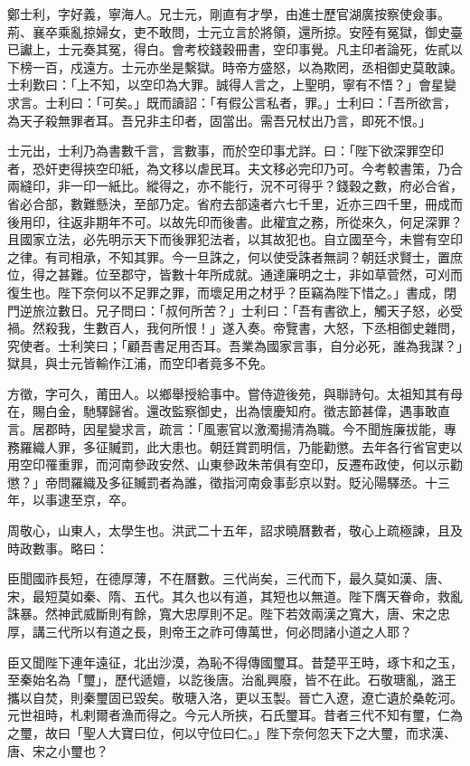 \begin{pinyinscope}
鄭士利，字好義，寧海人。兄士元，剛直有才學，由進士歷官湖廣按察使僉事。荊、襄卒乘亂掠婦女，吏不敢問，士元立言於將領，還所掠。安陸有冤獄，御史臺已讞上，士元奏其冤，得白。會考校錢穀冊書，空印事覺。凡主印者論死，佐貳以下榜一百，戍遠方。士元亦坐是繫獄。時帝方盛怒，以為欺罔，丞相御史莫敢諫。士利歎曰：「上不知，以空印為大罪。誠得人言之，上聖明，寧有不悟？」會星變求言。士利曰：「可矣。」既而讀詔：「有假公言私者，罪。」士利曰：「吾所欲言，為天子殺無罪者耳。吾兄非主印者，固當出。需吾兄杖出乃言，即死不恨。」

士元出，士利乃為書數千言，言數事，而於空印事尤詳。曰：「陛下欲深罪空印者，恐奸吏得挾空印紙，為文移以虐民耳。夫文移必完印乃可。今考較書策，乃合兩縫印，非一印一紙比。縱得之，亦不能行，況不可得乎？錢穀之數，府必合省，省必合部，數難懸決，至部乃定。省府去部遠者六七千里，近亦三四千里，冊成而後用印，往返非期年不可。以故先印而後書。此權宜之務，所從來久，何足深罪？且國家立法，必先明示天下而後罪犯法者，以其故犯也。自立國至今，未嘗有空印之律。有司相承，不知其罪。今一旦誅之，何以使受誅者無詞？朝廷求賢士，置庶位，得之甚難。位至郡守，皆數十年所成就。通達廉明之士，非如草菅然，可刈而復生也。陛下奈何以不足罪之罪，而壞足用之材乎？臣竊為陛下惜之。」書成，閉門逆旅泣數日。兄子問曰：「叔何所苦？」士利曰：「吾有書欲上，觸天子怒，必受禍。然殺我，生數百人，我何所恨！」遂入奏。帝覽書，大怒，下丞相御史雜問，究使者。士利笑曰；「顧吾書足用否耳。吾業為國家言事，自分必死，誰為我謀？」獄具，與士元皆輸作江浦，而空印者竟多不免。

方徵，字可久，莆田人。以鄉舉授給事中。嘗侍遊後苑，與聯詩句。太祖知其有母在，賜白金，馳驛歸省。還改監察御史，出為懷慶知府。徵志節甚偉，遇事敢直言。居郡時，因星變求言，疏言：「風憲官以激濁揚清為職。今不聞旌廉拔能，專務羅織人罪，多征贓罰，此大患也。朝廷賞罰明信，乃能勸懲。去年各行省官吏以用空印罹重罪，而河南參政安然、山東參政朱芾俱有空印，反遷布政使，何以示勸懲？」帝問羅織及多征贓罰者為誰，徵指河南僉事彭京以對。貶沁陽驛丞。十三年，以事逮至京，卒。

周敬心，山東人，太學生也。洪武二十五年，詔求曉曆數者，敬心上疏極諫，且及時政數事。略曰：

臣聞國祚長短，在德厚薄，不在曆數。三代尚矣，三代而下，最久莫如漢、唐、宋，最短莫如秦、隋、五代。其久也以有道，其短也以無道。陛下膺天眷命，救亂誅暴。然神武威斷則有餘，寬大忠厚則不足。陛下若效兩漢之寬大，唐、宋之忠厚，講三代所以有道之長，則帝王之祚可傳萬世，何必問諸小道之人耶？

臣又聞陛下連年遠征，北出沙漠，為恥不得傳國璽耳。昔楚平王時，琢卞和之玉，至秦始名為「璽」，歷代遞嬗，以訖後唐。治亂興廢，皆不在此。石敬瑭亂，潞王攜以自焚，則秦璽固已毀矣。敬瑭入洛，更以玉製。晉亡入遼，遼亡遺於桑乾河。元世祖時，札剌爾者漁而得之。今元人所挾，石氏璽耳。昔者三代不知有璽，仁為之璽，故曰「聖人大寶曰位，何以守位曰仁。」陛下奈何忽天下之大璽，而求漢、唐、宋之小璽也？


\end{pinyinscope}
